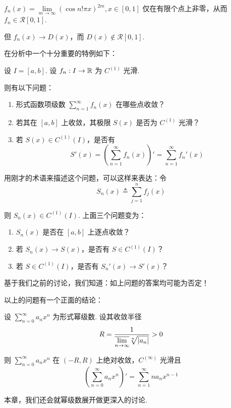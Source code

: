 \begin{example}
    $f_n(x)=\lim\limits_{m\to\infty}(\cos n!\pi x)^{2m},x\in[0,1]$ 仅在有限个点上非零，从而 $f_n\in\mathcal{R}[0,1]$.

    \vspace{0.2em}

    但 $f_n(x)\to D(x)$，而 $D(x)\notin\mathcal{R}[0,1]$.
\end{example}

\begin{example}
    在分析中一个十分重要的特例如下：

    设 $I=[a,b]$. 设 $f_n:I\to\mathbb{R}$ 为 $C^{(1)}$ 光滑.

    则有以下问题：

    \begin{enumerate}
        \item 形式函数项级数 $\sum\limits_{n=1}^\infty f_n(x)$ 在哪些点收敛？
        
        \item 若其在 $[a,b]$ 上收敛，其极限 $S(x)$ 是否为 $C^{(1)}$ 光滑？
        
        \item 若 $S(x)\in C^{(1)}(I)$，是否有
$$
S'(x)=\left(\sum_{n=1}^\infty f_n(x)\right)'=\sum_{n=1}^\infty f_n'(x)
$$
    \end{enumerate}

    用刚才的术语来描述这个问题，可以这样来表达：令
$$
S_n(x)\triangleq\sum_{j=1}^nf_j(x)
$$

    则 $S_n(x)\in C^{(1)}(I)$. 上面三个问题变为：

    \begin{enumerate}
        \item $S_n(x)$ 是否在 $[a,b]$ 上逐点收敛？
        
        \item 若 $S_n(x)\to S(x)$，是否有 $S\in C^{(1)}(I)$？
        
        \item 若 $S\in C^{(1)}(I)$，是否有 $S_n'(x)\to S'(x)$？
    \end{enumerate}

    基于我们之前的讨论，我们知道：如上问题的答案均可能为否定！
\end{example}

\begin{example}
    以上的问题有一个正面的结论：

    设 $\sum\limits_{n=0}^\infty a_nx^n$ 为形式幂级数. 设其收敛半径
$$
R=\frac{1}{\displaystyle\overline{\lim\limits_{n\to\infty}}\sqrt[n]{\left\lvert{a_n}\right\rvert}}>0
$$

    则 $\sum\limits_{n=0}^\infty a_nx^n$ 在 $(-R,R)$ 上绝对收敛，$C^{(\infty)}$ 光滑且
$$
\left(\sum_{n=0}^\infty a_nx^n\right)'=\sum_{n=1}^\infty na_nx^{n-1}
$$

    本章，我们还会就幂级数展开做更深入的讨论.
\end{example}

